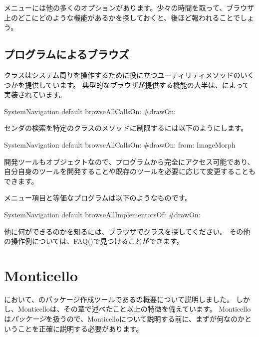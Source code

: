 \documentclass[a4paper,10pt,twoside]{book}
\begin{document}
メニューには他の多くのオプションがあります。少々の時間を取って、ブラウザ上のどこにどのような機能があるかを探しておくと、後ほど報われることでしょう。


\subsection{プログラムによるブラウズ}

クラスはシステム周りを操作するために役に立つユーティリティメソッドのいくつかを提供しています。
典型的なブラウザが提供する機能の大半は、によって実装されています。

\begin{code}{}
SystemNavigation default browseAllCallsOn: #drawOn:
\end{code}
センダの検索を特定のクラスのメソッドに制限するには以下のようにします。
\begin{code}{}
SystemNavigation default browseAllCallsOn: #drawOn: from: ImageMorph
\end{code}
開発ツールもオブジェクトなので、プログラムから完全にアクセス可能であり、自分自身のツールを開発することや既存のツールを必要に応じて変更することもできます。

メニュー項目と等価なプログラムは以下のようなものです。
\begin{code}{}
SystemNavigation default browseAllImplementorsOf: #drawOn:
\end{code}

他に何ができるのかを知るには、ブラウザでクラスを探してください。
その他の操作例については、FAQ()で見つけることができます。

\section{Monticello}

において、\pharo のパッケージ作成ツールであるの概要について説明しました。
しかし、Monticelloは、その章で述べたこと以上の特徴を備えています。
Monticelloは\emph{パッケージ}を扱うので、Monticelloについて説明する前に、まずが何なのかということを正確に説明する必要があります。
\end{document}
